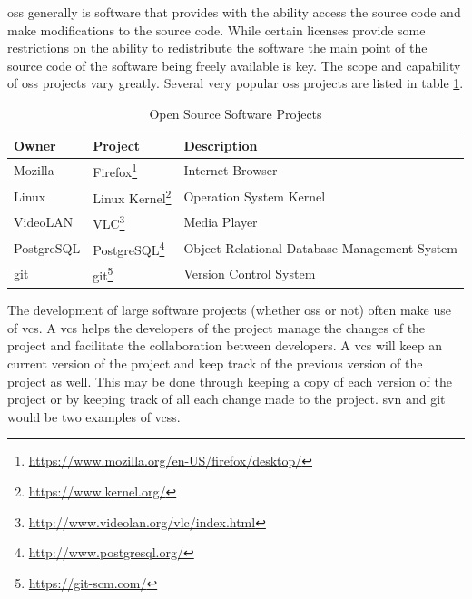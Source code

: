 \gls{oss} generally is software that provides with the ability access the source code and make modifications to the source code. While certain licenses provide some restrictions on the ability to redistribute the software the main point of the source code of the software being freely available is key. The scope and capability of \gls{oss} projects vary greatly. Several very popular \gls{oss} projects are listed in table \ref{tab:oss_projects}.

\begin{table}[h!]
\begin{minipage}{\textwidth}
\begin{center}
    \begin{tabular}{|l|l|l|}
        \hline
        Owner & Project & Description \\
        \hline
        Mozilla & Firefox\footnote{\url{https://www.mozilla.org/en-US/firefox/desktop/}} & Internet Browser \\
        Linux & Linux Kernel\footnote{\url{https://www.kernel.org/}} & Operation System Kernel \\
        VideoLAN & VLC\footnote{\url{http://www.videolan.org/vlc/index.html}} & Media Player \\
        PostgreSQL & PostgreSQL\footnote{\url{http://www.postgresql.org/}} & Object-Relational Database Management System \\
        git & git\footnote{\url{https://git-scm.com/}} & Version Control System \\
        \hline
    \end{tabular}
\end{center}
\caption{Open Source Software Projects}
\label{tab:oss_projects}
\end{minipage}
\end{table}

The development of large software projects (whether \gls{oss} or not) often make use of \gls{vcs}. A \gls{vcs} helps the developers of the project manage the changes of the project and facilitate the collaboration between developers. A \gls{vcs} will keep an current version of the project and keep track of the previous version of the project as well. This may be done through keeping a copy of each version of the project or by keeping track of all each change made to the project. \gls{svn} and git would be two examples of \gls{vcs}s.

